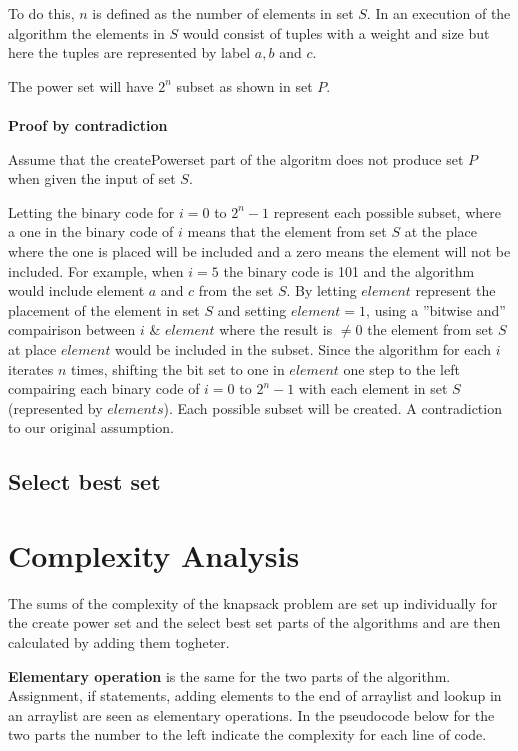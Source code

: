\documentclass{inc/mas}
\begin{document}
To do this, $n$ is defined as the number of elements in set $S$. In an execution of the algorithm the elements in $S$ would consist of tuples with a weight and size but here the tuples are represented by label $a,b$ and $c$.

The power set will have $2^n$ subset as shown in set $P$.\\\\

\textbf{Proof by contradiction}

Assume that the createPowerset part of the algoritm does not produce set $P$ when given the input of set $S$.

Letting the binary code for $i = 0$ to $2^n-1$ represent each possible subset, where a one in the binary code of $i$ means that the element from set $S$ at the place where the one is placed will be included and a zero means the element will not be included. For example, when $i = 5$ the binary code is 101 and the algorithm would include element $a$ and $c$ from the set $S$. By letting $element$ represent the placement of the element in set $S$ and setting $element = 1$, using a ''bitwise and'' compairison between $i$ \& $element$ where the result is $\neq0$ the element from set $S$ at place $element$ would be included in the subset. Since the algorithm for each $i$ iterates $n$ times, shifting the bit set to one in $element$ one step to the left compairing each binary code of $i = 0$ to $2^n-1$ with each element in set $S$ (represented by $elements$). Each possible subset will be created. A contradiction to our original assumption.

\subsection{Select best set}

\section{Complexity Analysis}

The sums of the complexity of the knapsack problem are set up individually for the create power set and the select best set parts of the algorithms and are then calculated by adding them togheter.

\textbf{Elementary operation} is the same for the two parts of the algorithm. Assignment, if statements, adding elements to the end of arraylist and lookup in an arraylist are seen as elementary operations. In the pseudocode below for the two parts the number to the left indicate the complexity for each line of code.
\end{document}
